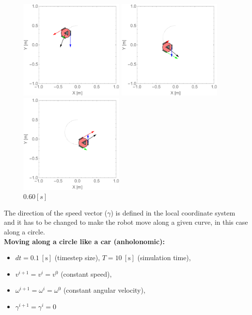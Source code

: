 \documentclass[12pt,english,twoside]{article}
\begin{document}
\begin{figure}[htb!]
	\centering
	\includegraphics[height=5cm]{figures/2d_simulation/animations/2D_move_along_circle_not_rotating/20}
	\caption{$0.20[s]$}
	\endminipage\hfill
	\centering
	\includegraphics[height=5cm]{figures/2d_simulation/animations/2D_move_along_circle_not_rotating/40}
	\caption{$0.40[s]$}
	\endminipage\hfill
	\centering
	\includegraphics[height=5cm]{figures/2d_simulation/animations/2D_move_along_circle_not_rotating/60}
	\caption{$0.60[s]$}
	\endminipage\hfill
\end{figure}
The direction of the speed vector ($\gamma$) is defined in the local coordinate system and it has to be changed to make the robot move along a given curve, in this case along a circle.\\[0.3cm]
\noindent \textbf{Moving along a circle like a car (anholonomic):}
\begin{itemize}
	\item $dt=0.1~[\text{s}]$ (timestep size), $T=10~[\text{s}]$ (simulation time),
	\item $v^{i+1} = v^{i} = v^{0}$ (constant speed),
	\item $\omega^{i+1} = \omega^{i} = \omega^{0}$ (constant angular velocity),
	\item $\gamma^{i+1} = \gamma^i = 0$
\end{itemize}
\end{document}
